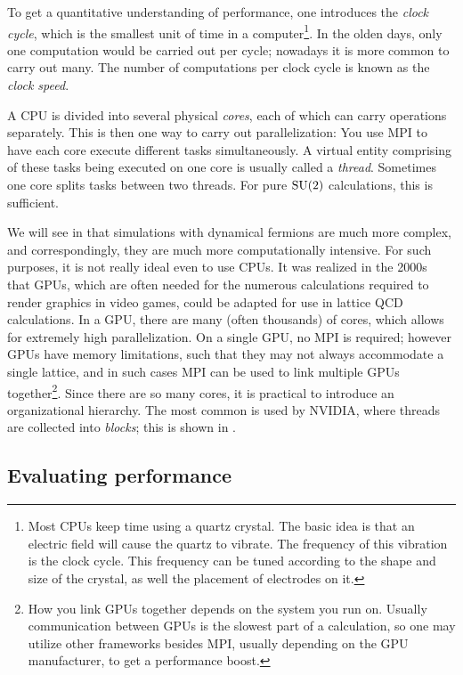 To get a quantitative understanding of performance, one introduces
the {\it clock cycle}, which is the smallest unit of
time in a computer\footnote{Most CPUs keep time using a quartz crystal.
The basic idea is that an electric field will cause the quartz to
vibrate. The frequency of this vibration is the clock cycle.
This frequency can be tuned according to the shape and size of the
crystal, as well the placement of electrodes on it.}.
In the olden days, only one computation would be carried out per cycle;
nowadays it is more common to carry out many. The number of
computations per clock cycle is known as the {\it clock speed}.

A CPU is divided into several physical {\it cores}, each of which can
carry operations separately. This is then one way to carry out parallelization:
You use MPI to have each core execute different tasks simultaneously.
A virtual entity comprising of these tasks being executed on one core
is usually called a {\it thread}. Sometimes one core splits
tasks between two threads. For pure $\operatorname{SU}(2)$ calculations, this
is sufficient.

We will see in  that simulations with dynamical fermions
are much more complex, and correspondingly, they are much more
computationally intensive. For such purposes, it is not really ideal even
to use CPUs. It was realized in the 2000s~\cite{egri_lattice_2007}
that GPUs, which
are often needed for the numerous calculations required to render graphics
in video games, could be adapted for use in lattice QCD calculations.
In a GPU, there are many (often thousands) of cores, which allows for
extremely high parallelization. On a single GPU, no MPI is required;
however GPUs have memory limitations, such that they may not always accommodate
a single lattice, and in such cases MPI can be used to link
multiple GPUs together\footnote{How you link GPUs together depends on the
system you run on. Usually communication between GPUs is the slowest part
of a calculation, so one may utilize other frameworks besides MPI, usually
depending on the GPU manufacturer, to get a performance boost.}.
Since there are so many cores, it is practical to introduce an organizational
hierarchy. The most common is used by NVIDIA, where threads are collected
into {\it blocks}; this is shown in .

\subsection{Evaluating performance}

